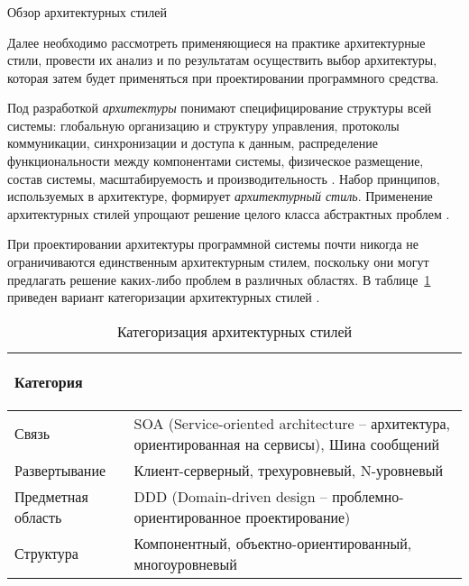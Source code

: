 \subsubsection{} Обзор архитектурных стилей
\label{sec:analysis:literature:architecture}

Далее необходимо рассмотреть применяющиеся на практике архитектурные стили, провести их анализ и по результатам осуществить выбор архитектуры, которая затем будет применяться при проектировании программного средства.

Под разработкой \emph{архитектуры} понимают специфицирование структуры всей системы: глобальную организацию и структуру управления, протоколы коммуникации, синхронизации и доступа к данным, распределение функциональности между компонентами системы, физическое размещение, состав системы, масштабируемость и производительность \cite{introduction_to_architecture}. Набор принципов, используемых в архитектуре, формирует \emph{архитектурный стиль}. Применение архитектурных стилей упрощают решение целого класса абстрактных проблем \cite{architecture_volosevich}.

При проектировании архитектуры программной системы почти никогда не ограничиваются единственным архитектурным стилем, поскольку они могут предлагать решение каких-либо проблем в различных областях. В таблице~\ref{table:analysis:architectures:categorization} приведен вариант категоризации архитектурных стилей \cite{application_architecture_guide}.


\begin{table}[ht]
\caption{Категоризация архитектурных стилей}
\label{table:analysis:architectures:categorization}
  \begin{tabular}{|>{\raggedright}m{} 
                  |>{\raggedright\arraybackslash}m{}|}
  \hline {\begin{center} Категория \end{center} } &{ \begin{center} Архитектурный стиль \end{center} } \\
  \hline Связь & SOA (Service-oriented architecture -- архитектура, ориентированная на сервисы), Шина сообщений \\
  \hline Развертывание & Клиент-серверный, трехуровневый, N-уровневый \\
  \hline Предметная область & DDD (Domain-driven design -- проблемно-ориентированное проектирование) \\
  \hline Структура & Компонентный, объектно-ориентированный, многоуровневый\\
  \hline
  \end{tabular}
\end{table}

